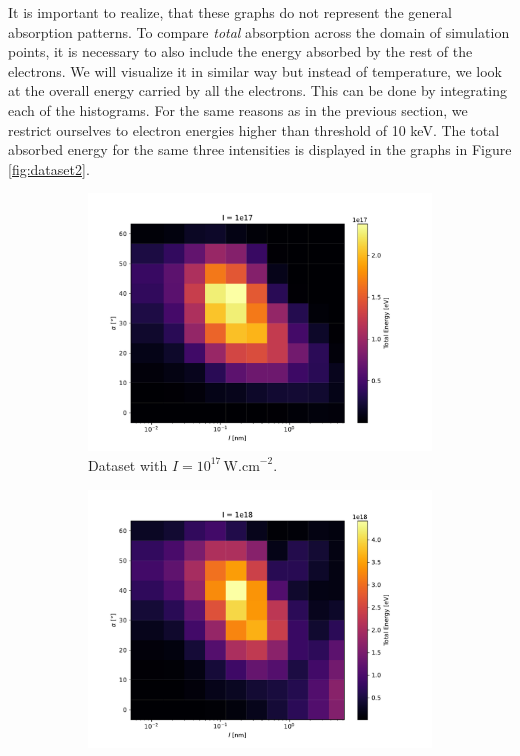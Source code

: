 It is important to realize, that these graphs do not represent the general absorption patterns. To compare \textit{total} absorption across the domain of simulation points, it is necessary to also include the energy absorbed by the rest of the electrons. We will visualize it in similar way but instead of temperature, we look at the overall energy carried by all the electrons. This can be done by integrating each of the histograms. For the same reasons as in the previous section, we restrict ourselves to electron energies higher than threshold of 10 keV. The total absorbed energy for the same three intensities is displayed in the graphs in Figure \ref{fig:dataset2}.

\begin{figure}[ht]
	\centering
	\begin{subfigure}{0.49\textwidth}
		\centering
		\includegraphics[width=\textwidth]{figures/I_1e17_cut_10}
		\caption{Dataset with $I = 10^{17} \, \mathrm{W.cm}^{-2}$.}
		\label{fig:dataset2-a}
	\end{subfigure}
	\hfill
	\begin{subfigure}{0.49\textwidth}
		\centering
		\includegraphics[width=\textwidth]{figures/I_1e18_cut_10}

\end{subfigure}
\end{figure}
